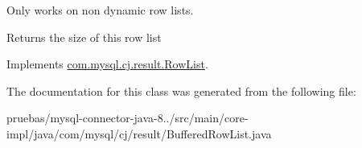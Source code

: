 Only works on non dynamic row lists.

\begin{DoxyReturn}{Returns}
the size of this row list 
\end{DoxyReturn}


Implements \mbox{\hyperlink{interfacecom_1_1mysql_1_1cj_1_1result_1_1_row_list_a2b6e2d9ed59e362e06b9fc8a110ccd89}{com.\+mysql.\+cj.\+result.\+Row\+List}}.



The documentation for this class was generated from the following file\+:\begin{DoxyCompactItemize}
\item 
pruebas/mysql-\/connector-\/java-\/8../src/main/core-\/impl/java/com/mysql/cj/result/Buffered\+Row\+List.\+java\end{DoxyCompactItemize}
